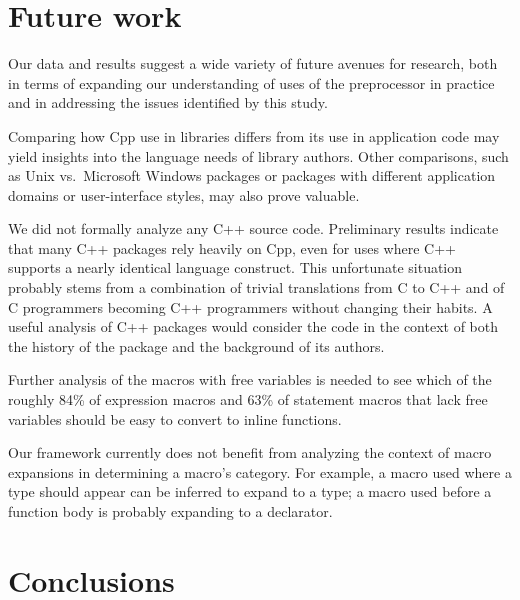 \documentclass[10pt]{article}
\begin{document}
\section{Future work}
\label{sec:future-work}

 
Our data and results suggest a wide variety of future avenues for research,
both in terms of expanding our understanding of uses of the
preprocessor in practice and in addressing the issues identified by
this study.

Comparing how Cpp use in libraries differs from its use in application code
may yield insights into the language needs of library authors.  Other
comparisons, such as Unix vs.~Microsoft Windows packages or packages with
different application domains or user-interface styles, may also prove valuable.

We did not formally analyze any C++ source code.  Preliminary results
indicate that many C++ packages rely heavily on Cpp, even for uses where C++ supports
a nearly identical language construct.  This unfortunate situation probably
stems from a combination of trivial translations from C to C++ and of C
programmers becoming C++ programmers without changing their habits.  A
useful analysis of C++ packages would consider the code in the context of
both the history of the package and the background of its authors.


Further analysis of the macros with free variables is needed to see which
of the roughly 84\% of expression macros and 63\% of statement macros that
lack free variables should be easy to convert to inline functions.

Our framework currently does not benefit from analyzing the context of
macro expansions in determining a macro's category.  For example, a
macro used where a type should appear can be inferred to expand to a
type; a macro used before a function body is probably expanding to a
declarator.



\section{Conclusions}
\label{sec:conclusion}
\end{document}
